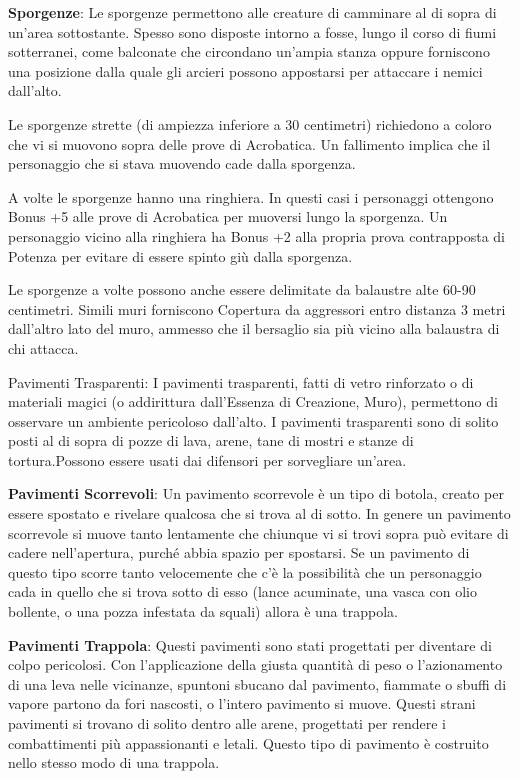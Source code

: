 \documentclass[a4paper,11pt,twoside,openany]{book}
\begin{document}
\textbf{Sporgenze}: Le sporgenze permettono alle creature di camminare al di sopra di un'area sottostante. Spesso sono disposte intorno a fosse, lungo il corso di fiumi sotterranei, come balconate che circondano un'ampia stanza oppure forniscono una posizione dalla quale gli arcieri possono appostarsi per attaccare i nemici dall'alto.

Le sporgenze strette (di ampiezza inferiore a 30 centimetri) richiedono a coloro che vi si muovono sopra delle prove di Acrobatica. Un fallimento implica che il personaggio che si stava muovendo cade dalla sporgenza.

A volte le sporgenze hanno una ringhiera. In questi casi i personaggi ottengono Bonus +5 alle prove di Acrobatica per muoversi lungo la sporgenza. Un personaggio vicino alla ringhiera ha Bonus +2 alla propria prova contrapposta di Potenza per evitare di essere spinto giù dalla sporgenza.

Le sporgenze a volte possono anche essere delimitate da balaustre alte 60-90 centimetri. Simili muri forniscono Copertura da aggressori entro distanza 3 metri dall'altro lato del muro, ammesso che il bersaglio sia più vicino alla balaustra di chi attacca.

Pavimenti Trasparenti: I pavimenti trasparenti, fatti di vetro rinforzato o di materiali magici (o addirittura dall'Essenza di Creazione, Muro), permettono di osservare un ambiente pericoloso dall'alto. I pavimenti trasparenti sono di solito posti al di sopra di pozze di lava, arene, tane di mostri e stanze di tortura.Possono essere usati dai difensori
per sorvegliare un'area.

\textbf{Pavimenti Scorrevoli}: Un pavimento scorrevole è un tipo di botola, creato per essere spostato e rivelare qualcosa che si trova al di sotto. In genere un pavimento scorrevole si muove tanto lentamente che chiunque vi si trovi sopra può evitare di cadere nell'apertura, purché abbia spazio per spostarsi. Se un pavimento di questo tipo scorre tanto velocemente che c'è la possibilità che un personaggio cada in quello che si trova sotto di esso (lance acuminate, una vasca con olio bollente, o una pozza infestata da squali) allora è una trappola.

\textbf{Pavimenti Trappola}: Questi pavimenti sono stati progettati per diventare di colpo pericolosi. Con l'applicazione della giusta quantità di peso o l'azionamento di una leva nelle vicinanze, spuntoni sbucano dal pavimento, fiammate o sbuffi di vapore partono da fori nascosti, o l'intero pavimento si muove. Questi strani pavimenti si trovano di solito dentro alle arene, progettati per rendere i combattimenti più appassionanti e letali. Questo tipo di pavimento è costruito nello stesso modo di una trappola.
\end{document}
